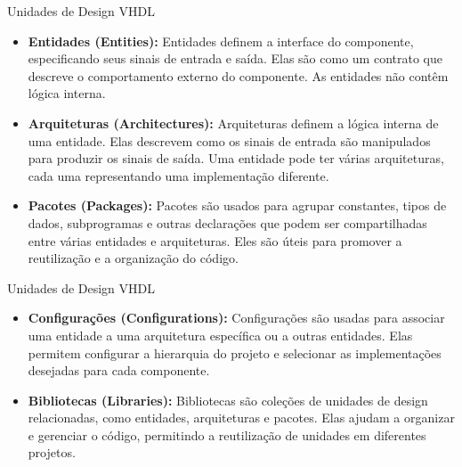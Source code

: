 \documentclass[aspectratio=169]{beamer}
\begin{document}
\begin{frame}{Unidades de Design VHDL}
	\justifying
	
	\begin{itemize}
		\justifying
		\item \textbf{Entidades (Entities):} Entidades definem a interface do componente, especificando seus sinais de entrada e saída. Elas são como um contrato que descreve o comportamento externo do componente. As entidades não contêm lógica interna.
		
		\item \textbf{Arquiteturas (Architectures):} Arquiteturas definem a lógica interna de uma entidade. Elas descrevem como os sinais de entrada são manipulados para produzir os sinais de saída. Uma entidade pode ter várias arquiteturas, cada uma representando uma implementação diferente.
		
		\item \textbf{Pacotes (Packages):} Pacotes são usados para agrupar constantes, tipos de dados, subprogramas e outras declarações que podem ser compartilhadas entre várias entidades e arquiteturas. Eles são úteis para promover a reutilização e a organização do código.
		
		

	\end{itemize}
	
	
\end{frame}


\begin{frame}{Unidades de Design VHDL}
	\justifying
	
	\begin{itemize}
		\justifying

		
		\item \textbf{Configurações (Configurations):} Configurações são usadas para associar uma entidade a uma arquitetura específica ou a outras entidades. Elas permitem configurar a hierarquia do projeto e selecionar as implementações desejadas para cada componente.
		
		\item \textbf{Bibliotecas (Libraries):} Bibliotecas são coleções de unidades de design relacionadas, como entidades, arquiteturas e pacotes. Elas ajudam a organizar e gerenciar o código, permitindo a reutilização de unidades em diferentes projetos.
		
		
	\end{itemize}
	
	
\end{frame}
\end{document}
